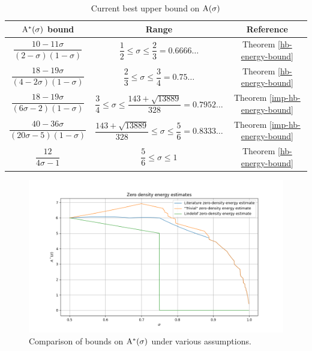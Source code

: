 \begin{table}[ht]
    \def\arraystretch{2}
    \centering
    \caption{Current best upper bound on $\mathrm{A}(\sigma)$}
    \begin{tabular}{|c|c|c|}
    \hline
    $\mathrm{A}^*(\sigma)$ bound & Range & Reference\\
    \hline
    $\dfrac{10 - 11\sigma}{(2 - \sigma)(1 - \sigma)}$ & $\dfrac{1}{2} \leq \sigma \le \dfrac{2}{3} = 0.6666\ldots$ & Theorem \ref{hb-energy-bound}\\
    \hline
    $\dfrac{18 - 19\sigma}{(4 - 2\sigma)(1 - \sigma)}$ & $\dfrac{2}{3} \leq \sigma \le \dfrac{3}{4} = 0.75\ldots$ & Theorem \ref{hb-energy-bound}\\
    \hline
    $\dfrac{18 - 19\sigma}{(6\sigma - 2)(1 - \sigma)}$ & $\dfrac{3}{4} \leq \sigma \le \dfrac{143 + \sqrt{13889}}{328} = 0.7952\ldots$ & Theorem \ref{imp-hb-energy-bound}\\
    \hline
    $\dfrac{40 - 36\sigma}{(20\sigma - 5)(1 - \sigma)}$ & $\dfrac{143 + \sqrt{13889}}{328} \leq \sigma \le \dfrac{5}{6} = 0.8333\ldots$ & Theorem \ref{imp-hb-energy-bound}\\
    \hline
    $\dfrac{12}{4\sigma - 1}$ & $\dfrac{5}{6} \leq \sigma \le 1$ & Theorem \ref{hb-energy-bound}\\
    \hline
    \end{tabular}
    \label{zero_density_energy_estimates_table}
\end{table}

\begin{figure}
    \centering
    \includegraphics[width=0.5\linewidth]{chapter/zero_density_energy_estimate.png}
    \caption{Comparison of bounds on $\mathrm{A}^*(\sigma)$ under various assumptions.}
    \label{fig:zero_density_energy_estimate}
\end{figure}



